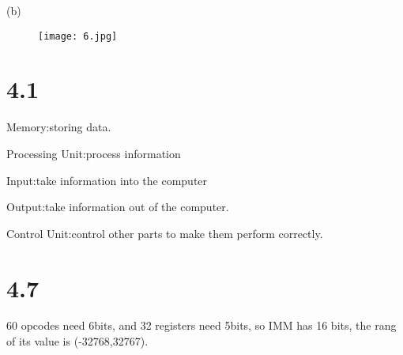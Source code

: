 \documentclass[20pt]{ctexart}
\begin{document}
(b)\begin{figure}[H]
  \centering
  \texttt{[image: 6.jpg]}
\end{figure}

\section*{4.1}
Memory:storing data.

Processing Unit:process information

Input:take information into the computer

Output:take information out of the computer.

Control Unit:control other parts to make them perform correctly.

\section*{4.7}
60 opcodes need 6bits, and 32 registers need 5bits, so IMM has 16 bits, the rang of its value is (-32768,32767).


\end{document}
